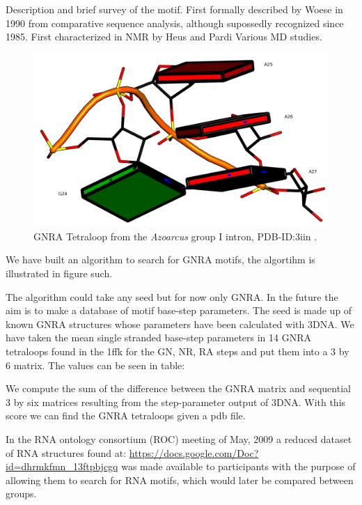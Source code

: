 Description and brief survey of the motif.
First  formally  described  by  Woese \cite{woese1990}  in  1990  from
comparative  sequence analysis,  although supossedly  recognized since
1985. First characterized in NMR by Heus and Pardi \cite{heus1991}
Various MD studies.
\cite{depaul2010}


\begin{figure}
\centering 
\includegraphics[angle=0, scale=2]{Chapter5/gnra24.png}
\caption{GNRA Tetraloop from the \textit{Azoarcus} group I intron,
  PDB-ID:3iin   \cite{antonioli2010}.}
\end{figure}

We have built an algorithm to search for GNRA motifs, the algortihm is
illustrated in figure such.

The algorithm could take any seed but for now only GNRA. In the future
the aim is to make a database of motif base-step parameters.
The seed  is made  up of known  GNRA structures whose  parameters have
been calculated with 3DNA.
We have taken the mean single stranded base-step parameters in 14 GNRA
tetraloops found  in the 1ffk  for the GN,  NR, RA steps and  put them
into a 3 by 6 matrix. The values can be seen in table:

We  compute the  sum of  the difference  between the  GNRA  matrix and
sequential 3 by six  matrices resulting from the step-parameter output
of 3DNA. With  this score we can find the GNRA  tetraloops given a pdb
file.

In the  RNA ontology consortium (ROC)  meeting of May,  2009 a reduced
dataset        of        RNA        structures        found        at:
\url{https://docs.google.com/Doc?id=dhrmkfmn_13ftpbjcgq}    was   made
available to participants with the  purpose of allowing them to search
for RNA motifs, which would later be compared between groups.

